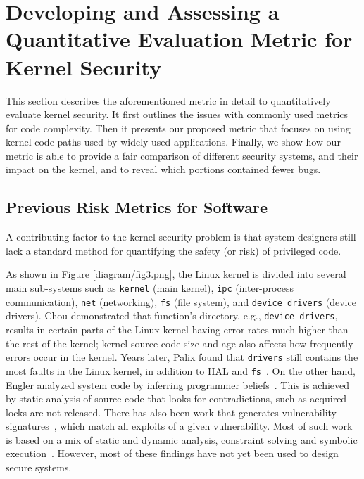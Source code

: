 \section{Developing and Assessing a Quantitative Evaluation Metric for
Kernel Security}
\label{sec.metric}
 
This section describes the aforementioned metric in detail to 
quantitatively evaluate kernel security. It first outlines the issues with
commonly used metrics for code complexity. Then it presents our proposed metric that
focuses on using kernel code paths used by %
widely used applications. Finally, we
show how our metric is able to provide a fair comparison of 
different security systems, and their impact on the kernel, 
and to reveal which portions contained fewer bugs.

\subsection{Previous Risk Metrics for Software}

A contributing factor to the kernel security problem is that system
designers 
still lack a standard method for quantifying the safety (or risk) of
privileged code.   


As shown in Figure \ref{diagram/fig3.png}, the Linux kernel is divided into several main sub-systems such as %
\texttt{kernel} (main kernel), \texttt{ipc} (inter-process communication), 
\texttt{net} (networking), \texttt{fs} (file system), and \texttt{device drivers} (device drivers). Chou %
\cite{PittSFIeld} demonstrated that function's directory, e.g., 
\texttt{device drivers}, results in certain parts of the Linux kernel having error rates much 
higher than the rest of the kernel; kernel source code size and age also affects
how frequently errors occur in the kernel.
Years later, Palix found that \texttt{drivers} still contains the most faults in 
the Linux kernel, in addition to HAL and \texttt{fs}~\cite{palix2011faults}. 
On the other hand, Engler analyzed system code by inferring programmer 
beliefs~\cite{engler2001bugs}. This is achieved by static analysis
of source code that looks for contradictions, such as acquired locks are 
not released. There has also been work that generates vulnerability 
signatures~\cite{brumley2006towards}, which match all exploits
of a given vulnerability. Most of such work is based on a mix of static and
dynamic analysis, constraint solving and symbolic execution~\cite{chou2003static}.
However, most of these findings have not yet been used to design 
secure systems. 

